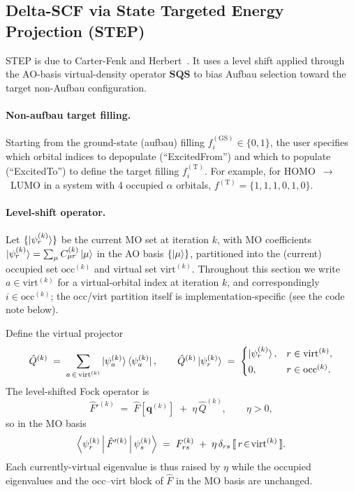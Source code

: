 \documentclass[11pt,a4paper]{article}
\newcommand{\qq}{\mathbf{q}}
\begin{document}
\subsection{Delta-SCF via State Targeted Energy Projection (STEP)}
\label{sec:step}

STEP is due to Carter-Fenk and Herbert~\cite{CarterFenkHerbert2020}.
It uses a level shift applied through the AO-basis virtual-density
operator $\mathbf{S}\mathbf{Q}\mathbf{S}$ to bias Aufbau selection
toward the target non-Aufbau configuration.

\paragraph{Non-aufbau target filling.}
Starting from the ground-state (aufbau) filling
$f^{(\mathrm{GS})}_i\in\{0,1\}$, the user specifies which orbital
indices to depopulate (``ExcitedFrom'') and which to populate
(``ExcitedTo'') to define the target filling $f^{(\mathrm{T})}_i$. For
example, for HOMO~$\to$~LUMO in a system with 4 occupied $\alpha$
orbitals, $f^{(\mathrm{T})}=\{1,1,1,0,1,0\}$.

\paragraph{Level-shift operator.}
Let $\{\ket{\psi^{(k)}_r}\}$ be the current MO set at iteration $k$,
with MO coefficients $\ket{\psi^{(k)}_r}=\sum_\mu C^{(k)}_{\mu r}\ket{\mu}$
in the AO basis $\{\ket{\mu}\}$, partitioned into the (current)
occupied set $\mathrm{occ}^{(k)}$ and virtual set $\mathrm{virt}^{(k)}$.
Throughout this section we write $a\in\mathrm{virt}^{(k)}$ for a
virtual-orbital index at iteration $k$, and correspondingly
$i\in\mathrm{occ}^{(k)}$; the occ/virt partition itself is implementation-specific
(see the code note below).

Define the virtual projector
\begin{equation}
\hat{Q}^{(k)} \;=\; \sum_{a\,\in\,\mathrm{virt}^{(k)}}
\ket{\psi^{(k)}_a}\bra{\psi^{(k)}_a},
\qquad
\hat{Q}^{(k)}\ket{\psi^{(k)}_r}\;=\;\begin{cases}
\ket{\psi^{(k)}_r}, & r\in\mathrm{virt}^{(k)},\\[2pt]
0, & r\in\mathrm{occ}^{(k)}.
\end{cases}
\end{equation}
The level-shifted Fock operator is
\begin{equation}
\hat{F}'^{(k)} \;=\; \hat{F}[\qq^{(k)}] \;+\; \eta\,\hat{Q}^{(k)},
\qquad \eta>0,
\label{eq:stepOp}
\end{equation}
so in the MO basis
\begin{equation}
\Braket{\psi^{(k)}_r|\hat{F}'^{(k)}|\psi^{(k)}_s}
\;=\; F^{(k)}_{rs} \;+\; \eta\,\delta_{rs}\,[\![\,r\!\in\!\mathrm{virt}^{(k)}\,]\!].
\end{equation}
Each currently-virtual eigenvalue is thus raised by $\eta$ while the
occupied eigenvalues and the occ--virt block of $\hat{F}$ in the MO
basis are unchanged.
\end{document}
